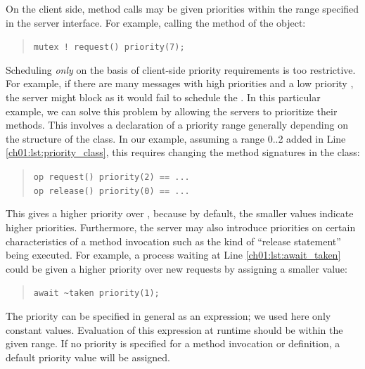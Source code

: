 On the client side, method calls may be given priorities within the range specified in the server interface. For example, calling the  method of the  object: 

\begin{quote}
\lstinline{mutex ! request() priority(7);}
\end{quote}

Scheduling \textit{only} on the basis of client-side priority requirements is too restrictive.
For example, if there are many  messages with high priorities and a low priority , the server might block as it would fail to schedule the .
In this particular example, we can solve this problem by allowing the servers to
prioritize their methods.
This involves a declaration of a priority range generally depending on the structure of the class. 
In our example, assuming a range 0..2 added in Line \ref{ch01:lst:priority_class}, this requires changing the method signatures in the {} class: 

\begin{quote}
\lstinline{op request() priority(2) == ...}\\
\lstinline{op release() priority(0) == ...}
\end{quote}

This gives   a higher priority over , because by default, the smaller values indicate higher priorities.
Furthermore, the server may also introduce priorities on certain 
characteristics of a method invocation such as the kind of ``release statement''
being executed. 
For example, a process waiting at Line \ref{ch01:lst:await_taken} could be given a higher priority over new requests by assigning a smaller value:

\begin{quote}
\lstinline{await ~taken priority(1);}
\end{quote}

The priority can be specified in general as an expression; we used here
only constant values.
Evaluation of this expression at runtime should be within the given
range.
If no priority is specified for a method invocation or definition, a
default priority value will be assigned.

% 

